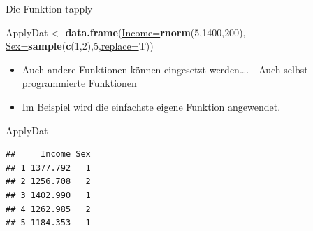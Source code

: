 \documentclass[
  ignorenonframetext,
]{beamer}
\newenvironment{Shaded}{\begin{snugshade}}{\end{snugshade}}
\newcommand{\DataTypeTok}[1]{\textcolor[rgb]{0.74,0.68,0.62}{\underline{#1}}}
\newcommand{\DecValTok}[1]{\textcolor[rgb]{0.27,0.67,0.26}{#1}}
\newcommand{\KeywordTok}[1]{\textcolor[rgb]{0.26,0.66,0.93}{\textbf{#1}}}
\newcommand{\NormalTok}[1]{\textcolor[rgb]{0.74,0.68,0.62}{#1}}
\newcommand{\StringTok}[1]{\textcolor[rgb]{0.02,0.61,0.04}{#1}}
\providecommand{\tightlist}{%
  \setlength{\itemsep}{0pt}\setlength{\parskip}{0pt}}
\begin{document}
\begin{frame}[fragile]{Die Funktion tapply}
\protect\hypertarget{die-funktion-tapply}{}

\begin{Shaded}
\begin{Highlighting}[]
\NormalTok{ApplyDat <-}\StringTok{ }\KeywordTok{data.frame}\NormalTok{(}\DataTypeTok{Income=}\KeywordTok{rnorm}\NormalTok{(}\DecValTok{5}\NormalTok{,}\DecValTok{1400}\NormalTok{,}\DecValTok{200}\NormalTok{),}
                       \DataTypeTok{Sex=}\KeywordTok{sample}\NormalTok{(}\KeywordTok{c}\NormalTok{(}\DecValTok{1}\NormalTok{,}\DecValTok{2}\NormalTok{),}\DecValTok{5}\NormalTok{,}\DataTypeTok{replace=}\NormalTok{T))}
\end{Highlighting}
\end{Shaded}

\begin{itemize}
\tightlist
\item
  Auch andere Funktionen können eingesetzt werden\ldots{}. - Auch selbst
  programmierte Funktionen
\item
  Im Beispiel wird die einfachste eigene Funktion angewendet.
\end{itemize}

\begin{Shaded}
\begin{Highlighting}[]
\NormalTok{ApplyDat}
\end{Highlighting}
\end{Shaded}

\begin{verbatim}
##     Income Sex
## 1 1377.792   1
## 2 1256.708   2
## 3 1402.990   1
## 4 1262.985   2
## 5 1184.353   1
\end{verbatim}

\end{frame}
\end{document}
